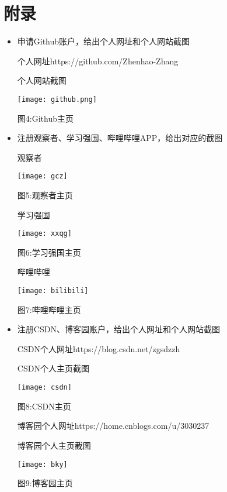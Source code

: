 \documentclass{article}
\begin{document}
\section{附录}
\begin{itemize}
    \item 申请Github账户，给出个人网址和个人网站截图
    
    个人网址https://github.com/Zhenhao-Zhang
    
    个人网站截图
    \begin{center}
    \centering
    \texttt{[image: github.png]}
    \caption{图4:Github主页}
 
    \end{center}
    
    \item 注册观察者、学习强国、哔哩哔哩APP，给出对应的截图
    
    观察者
    
    \begin{center}
    \centering
    \texttt{[image: gcz]}\par
    \caption{图5:观察者主页}
    \end{center}
    
    学习强国
    
    \begin{center}
    \centering
    \texttt{[image: xxqg]}\par
    \par
    \caption{图6:学习强国主页}
    \end{center}
    
    哔哩哔哩
    \begin{center}
    \centering
    \texttt{[image: bilibili]}\par
    \caption{图7:哔哩哔哩主页}
    \end{center}
    \item 注册CSDN、博客园账户，给出个人网址和个人网站截图
    
    CSDN个人网址https://blog.csdn.net/zgsdzzh
    
    CSDN个人主页截图
    \begin{center}
    \centering
    \texttt{[image: csdn]}
    \caption{图8:CSDN主页}
    \end{center}
    
    博客园个人网址https://home.cnblogs.com/u/3030237
    
    博客园个人主页截图
    \begin{center}
    \centering
    \texttt{[image: bky]}
    \caption{图9:博客园主页}
    \end{center}
    

\end{itemize}
\end{document}
